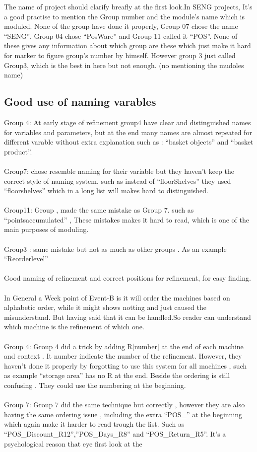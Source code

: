 The name of project should clarify breafly at the first look.In SENG projects, It's a good practise to mention the Group number and the module's name which is moduled. None of the group have done it properly, Group 07 chose the name “SENG”, Group 04 chose “PosWare” and Group 11 called it “POS”. None of these gives any information about which group are these which just make it hard for marker to figure group's number by himself. However group 3 just called Group3, which is the best in here but not enough. (no mentioning the mudoles name)

\subsection{Good use of naming varables}
\label{gooduseofnamingvarables}

Group 4: At early stage of refinement group4 have clear and distinguished names for variables and parameters, but at the end many names are almost repeated for different varable without extra explanation such as : “basket objects” and “basket product”.  \\ \\  Group7: chose resemble naming for their variable but they haven't keep the correct style of naming system, such as instead of “floorShelves” they used “floorshelves” which in a long list will makes hard to distinguished.  \\ \\  Group11: Group , made the same mistake as Group 7. such as “pointsaccumulated” , These mistakes makes it hard to read, which is one of the main purposes of moduling.  \\ \\  Group3 : same mistake but not as much as other groups . As an example “Reorderlevel”  \\ \\  Good naming of refinement and correct positions for refinement, for easy finding.  \\ \\  In General a Week point of Event-B is it will order the machines based on alphabetic order, while it might shows notting and just caused the misunderstand. But having said that it can be handled.So reader can understand which machine is the refinement of which one.  \\ \\  Group 4: Group 4 did a trick by adding R[number] at the end of each machine and context . It number indicate the number of the refinement. However, they haven't done it properly by forgotting to use this system for all machines , such as example “storage area” has no R at the end. Beside the ordering is still confusing . They could use the numbering at the beginning.  \\ \\  Group 7: Group 7 did the same technique but correctly , however they are also having the same ordering issue , including the extra “POS\_” at the beginning which again make it harder to read trough the list. Such as “POS\_Discount\_R12”,”POS\_Days\_R8” and “POS\_Return\_R5”. It's a psychological reason that eye first look at the 